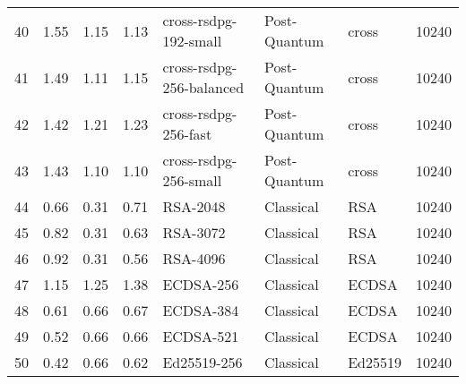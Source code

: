 \begin{table}
\begin{tabular}{lrrrlllr}
40 & 1.55 & 1.15 & 1.13 & cross-rsdpg-192-small & Post-Quantum & cross & 10240 \\
41 & 1.49 & 1.11 & 1.15 & cross-rsdpg-256-balanced & Post-Quantum & cross & 10240 \\
42 & 1.42 & 1.21 & 1.23 & cross-rsdpg-256-fast & Post-Quantum & cross & 10240 \\
43 & 1.43 & 1.10 & 1.10 & cross-rsdpg-256-small & Post-Quantum & cross & 10240 \\
44 & 0.66 & 0.31 & 0.71 & RSA-2048 & Classical & RSA & 10240 \\
45 & 0.82 & 0.31 & 0.63 & RSA-3072 & Classical & RSA & 10240 \\
46 & 0.92 & 0.31 & 0.56 & RSA-4096 & Classical & RSA & 10240 \\
47 & 1.15 & 1.25 & 1.38 & ECDSA-256 & Classical & ECDSA & 10240 \\
48 & 0.61 & 0.66 & 0.67 & ECDSA-384 & Classical & ECDSA & 10240 \\
49 & 0.52 & 0.66 & 0.66 & ECDSA-521 & Classical & ECDSA & 10240 \\
50 & 0.42 & 0.66 & 0.62 & Ed25519-256 & Classical & Ed25519 & 10240 \\
\bottomrule
\end{tabular}
\end{table}
